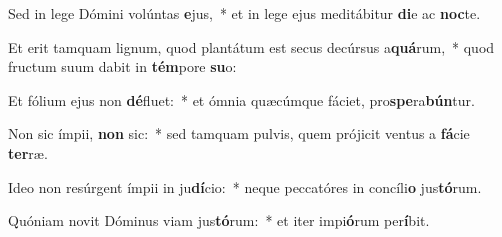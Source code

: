 \item Sed in lege Dómini volúntas \textbf{e}jus,~* et in lege ejus meditábitur \textbf{di}e ac \textbf{noc}te.
\item Et erit tamquam lignum, quod plantátum est secus decúrsus a\textbf{quá}rum,~* quod fructum suum dabit in \textbf{tém}pore \textbf{su}o:
\item Et fólium ejus non \textbf{dé}fluet:~* et ómnia quæcúmque fáciet, pro\textbf{spe}ra\textbf{bún}tur.
\item Non sic ímpii, \textbf{non} sic:~* sed tamquam pulvis, quem prójicit ventus a \textbf{fá}cie \textbf{ter}ræ.
\item Ideo non resúrgent ímpii in ju\textbf{dí}cio:~* neque peccatóres in concíli\textbf{o} jus\textbf{tó}rum.
\item Quóniam novit Dóminus viam jus\textbf{tó}rum:~* et iter impi\textbf{ó}rum per\textbf{í}bit.

